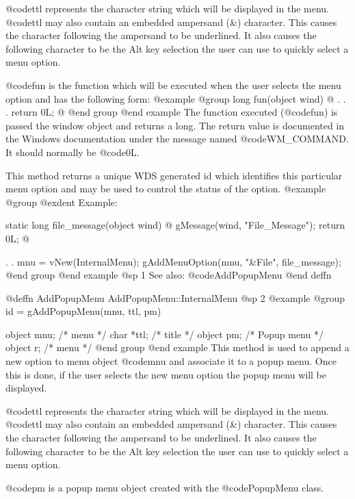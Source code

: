 @code{ttl} represents the character string which will be displayed
in the menu.  @code{ttl} may also contain an embedded ampersand (&)
character.  This causes the character following the ampersand to
be underlined.  It also causes the following character to be the
Alt key selection the user can use to quickly select a menu option.

@code{fun} is the function which will be executed when the user selects
the menu option and has the following form:
@example
@group
long    fun(object wind)
@{
        .
        .
        .
        return 0L;
@}
@end group
@end example
The function executed (@code{fun}) is passed the window object and
returns a long.  The return value is documented in the Windows documentation
under the message named @code{WM_COMMAND}.  It should normally be @code{0L}.

This method returns a unique WDS generated id which identifies this
particular menu option and may be used to control the status of the option.
@example
@group
@exdent Example:

static  long    file_message(object wind)
@{
        gMessage(wind, "File_Message");
        return 0L;
@}

        .
        .
        mnu = vNew(InternalMenu);
        gAddMenuOption(mnu, "&File", file_message);
@end group
@end example
@sp 1
See also:  @code{AddPopupMenu}
@end deffn











@deffn {AddPopupMenu} AddPopupMenu::InternalMenu
@sp 2
@example
@group
id = gAddPopupMenu(mnu, ttl, pm)

object  mnu;    /*  menu        */
char    *ttl;   /*  title       */
object  pm;     /*  Popup menu  */
object  r;      /*  menu        */
@end group
@end example
This method is used to append a new option to menu object @code{mnu} and
associate it to a popup menu.  Once this is done, if the user selects
the new menu option the popup menu will be displayed.

@code{ttl} represents the character string which will be displayed
in the menu.  @code{ttl} may also contain an embedded ampersand (&)
character.  This causes the character following the ampersand to
be underlined.  It also causes the following character to be the
Alt key selection the user can use to quickly select a menu option.

@code{pm} is a popup menu object created with the @code{PopupMenu}
class.

